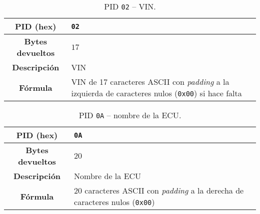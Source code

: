 \begin{table}[H]
  \centering
  \begin{tabularx}{\textwidth}{|c|X|}
    \hline
    \textbf{PID (hex)}       & \texttt{02}                    \\
    \hline
    \textbf{Bytes devueltos} & $17$                            \\
    \hline
    \textbf{Descripción}     & \ac{VIN} \\
    \hline
    \textbf{Fórmula}         & \ac{VIN} de 17 caracteres ASCII con \textit{padding} a la izquierda de caracteres nulos (\texttt{0x00}) si hace falta \\
    \hline
  \end{tabularx}
  \caption{\ac{PID} \texttt{02} -- \ac{VIN}.}
\end{table}

\begin{table}[H]
  \centering
  \begin{tabularx}{\textwidth}{|c|X|}
    \hline
    \textbf{PID (hex)}       & \texttt{0A}                    \\
    \hline
    \textbf{Bytes devueltos} & $20$                            \\
    \hline
    \textbf{Descripción}     & Nombre de la \ac{ECU} \\
    \hline
    \textbf{Fórmula}         & 20 caracteres ASCII con \textit{padding} a la derecha de caracteres nulos (\texttt{0x00}) \\
    \hline
  \end{tabularx}
  \caption{\ac{PID} \texttt{0A} -- nombre de la \ac{ECU}.}
\end{table}
